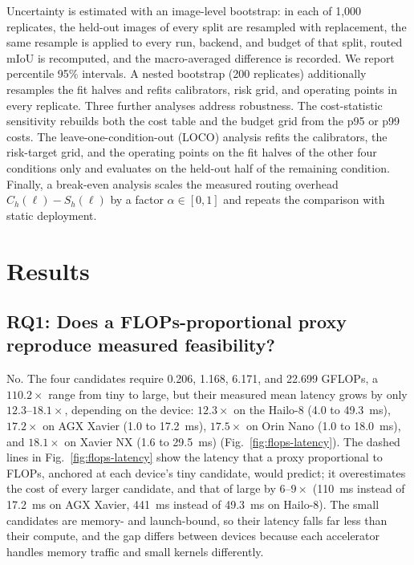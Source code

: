 \documentclass[a4paper,5p]{elsarticle}
\newcommand{\miou}{mIoU}
\begin{document}
Uncertainty is estimated with an image-level bootstrap: in each of 1,000 replicates, the held-out images of every split are resampled with replacement, the same resample is applied to every run, backend, and budget of that split, routed \miou{} is recomputed, and the macro-averaged difference is recorded. We report percentile 95\% intervals. A nested bootstrap (200 replicates) additionally resamples the fit halves and refits calibrators, risk grid, and operating points in every replicate. Three further analyses address robustness. The cost-statistic sensitivity rebuilds both the cost table and the budget grid from the p95 or p99 costs. The leave-one-condition-out (LOCO) analysis refits the calibrators, the risk-target grid, and the operating points on the fit halves of the other four conditions only and evaluates on the held-out half of the remaining condition. Finally, a break-even analysis scales the measured routing overhead $C_h(\ell)-S_h(\ell)$ by a factor $\alpha\in[0,1]$ and repeats the comparison with static deployment.

\section{Results}
\label{sec:results}

\subsection{RQ1: Does a FLOPs-proportional proxy reproduce measured feasibility?}
\label{sec:rq1}

No. The four candidates require 0.206, 1.168, 6.171, and 22.699 GFLOPs, a $110.2\times$ range from tiny to large, but their measured mean latency grows by only $12.3$--$18.1\times$, depending on the device: $12.3\times$ on the Hailo-8 (4.0 to 49.3~ms), $17.2\times$ on AGX Xavier (1.0 to 17.2~ms), $17.5\times$ on Orin Nano (1.0 to 18.0~ms), and $18.1\times$ on Xavier NX (1.6 to 29.5~ms) (Fig.~\ref{fig:flops-latency}). The dashed lines in Fig.~\ref{fig:flops-latency} show the latency that a proxy proportional to FLOPs, anchored at each device's tiny candidate, would predict; it overestimates the cost of every larger candidate, and that of large by $6$--$9\times$ (110~ms instead of 17.2~ms on AGX Xavier, 441~ms instead of 49.3~ms on Hailo-8). The small candidates are memory- and launch-bound, so their latency falls far less than their compute, and the gap differs between devices because each accelerator handles memory traffic and small kernels differently.
\end{document}
